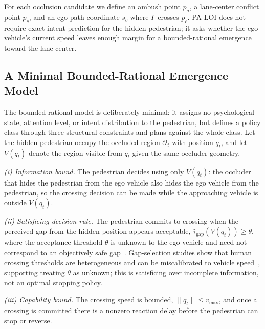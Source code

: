 \documentclass[journal]{IEEEtran}
\begin{document}
For each occlusion candidate we define an ambush point $p_a$, a lane-center conflict point $p_c$, and an ego path coordinate $s_c$ where $\Gamma$ crosses $p_c$. PA-LOI does not require exact intent prediction for the hidden pedestrian; it asks whether the ego vehicle's current speed leaves enough margin for a bounded-rational emergence toward the lane center.

\subsection{A Minimal Bounded-Rational Emergence Model}

The bounded-rational model is deliberately minimal: it assigns no psychological state, attention level, or intent distribution to the pedestrian, but defines a policy class through three structural constraints and plans against the whole class. Let the hidden pedestrian occupy the occluded region $\mathcal{O}_t$ with position $q_t$, and let $V(q_t)$ denote the region visible from $q_t$ given the same occluder geometry.

\emph{(i) Information bound.} The pedestrian decides using only $V(q_t)$: the occluder that hides the pedestrian from the ego vehicle also hides the ego vehicle from the pedestrian, so the crossing decision can be made while the approaching vehicle is outside $V(q_t)$.

\emph{(ii) Satisficing decision rule.} The pedestrian commits to crossing when the perceived gap from the hidden position appears acceptable, $\hat{\tau}_{\mathrm{gap}}(V(q_t)) \ge \theta$, where the acceptance threshold $\theta$ is unknown to the ego vehicle and need not correspond to an objectively safe gap~\cite{simon1955behavioral,rasouli2020survey}. Gap-selection studies show that human crossing thresholds are heterogeneous and can be miscalibrated to vehicle speed~\cite{oxley2005crossing}, supporting treating $\theta$ as unknown; this is satisficing over incomplete information, not an optimal stopping policy.

\emph{(iii) Capability bound.} The crossing speed is bounded, $\|\dot{q}_t\| \le v_{\max}$, and once a crossing is committed there is a nonzero reaction delay before the pedestrian can stop or reverse.
\end{document}
